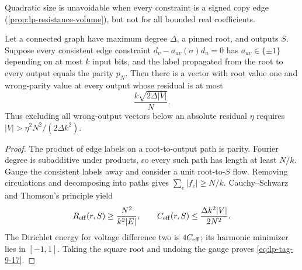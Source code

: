 Quadratic size is unavoidable when every constraint is a signed copy edge
(\cref{prop:lp-resistance-volume}), but not for all bounded real
coefficients.

\begin{proposition}
\label{prop:lp-resistance-volume}
Let a connected graph have maximum degree \(\Delta\), a pinned root, and
outputs \(S\).  Suppose every consistent edge constraint
\(d_v-a_{uv}(\sigma)d_u=0\) has \(a_{uv}\in\{\pm1\}\) depending on at most
\(k\) input bits, and the label propagated from the root to every output
equals the parity \(p_N\).  Then there is a vector
with root value one and wrong-parity value at every output whose residual is
at most
\begin{equation}
 \frac{k\sqrt{2\Delta|V|}}{N}.
\label{eq:lp-tag-9-17}
\end{equation}
Thus excluding all wrong-output vectors below an absolute residual \(\eta\)
requires \(|V|>\eta^2N^2/(2\Delta k^2)\).
\end{proposition}

\begin{proof}
The product of edge labels on a root-to-output path is parity.  Fourier degree
is subadditive under products, so every such path has length at least \(N/k\).
Gauge the consistent labels away and consider a unit root-to-\(S\) flow.
Removing circulations and decomposing into paths gives
\(\sum_e|f_e|\geq N/k\).  Cauchy--Schwarz and Thomson's principle yield
\[
 R_{\rm eff}(r,S)\geq\frac{N^2}{k^2|E|},\qquad
 C_{\rm eff}(r,S)\leq\frac{\Delta k^2|V|}{2N^2}.
\]
The Dirichlet energy for voltage difference two is \(4C_{\rm eff}\); its
harmonic minimizer lies in \([-1,1]\).  Taking the square root and undoing
the gauge proves \eqref{eq:lp-tag-9-17}.
\end{proof}

